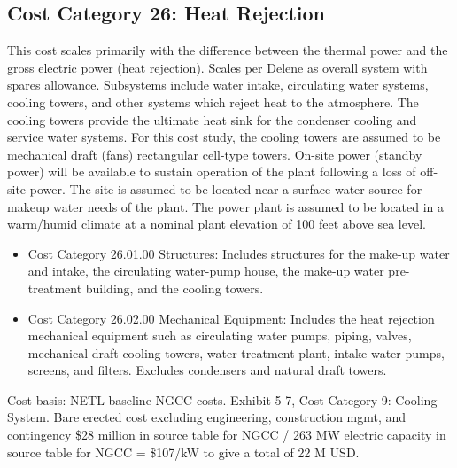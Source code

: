 \subsection{Cost Category 26: Heat Rejection} 

This cost scales primarily with the difference between the thermal power and the gross electric power (heat rejection). Scales per Delene as overall system with spares allowance.  Subsystems include water intake, circulating water systems, cooling towers, and other systems which reject heat to the atmosphere. The cooling towers provide the ultimate heat sink for the condenser cooling and service water systems.  For this cost study, the cooling towers are assumed to be mechanical draft (fans) rectangular cell-type towers.  On-site power (standby power) will be available to sustain operation of the plant following a loss of off-site power. The site is assumed to be located near a surface water source for makeup water needs of the plant.  The power plant is assumed to be located in a warm/humid climate at a nominal plant elevation of 100 feet above sea level.  

\begin{itemize}
    \item Cost Category 26.01.00 Structures: Includes structures for the make-up water and intake, the circulating water-pump house, the make-up water pre-treatment building, and the cooling towers.
    \item Cost Category 26.02.00 Mechanical Equipment: Includes the heat rejection mechanical equipment such as circulating water pumps, piping, valves, mechanical draft cooling towers, water treatment plant, intake water pumps, screens, and filters. Excludes condensers and natural draft towers.
\end{itemize}

Cost basis: NETL baseline NGCC costs. Exhibit 5-7, Cost Category 9: Cooling System. Bare erected cost excluding engineering, construction mgmt, and contingency \$28 million in source table for NGCC / 263 MW electric capacity in source table for NGCC = \$107/kW to give a total of 22 M USD.








